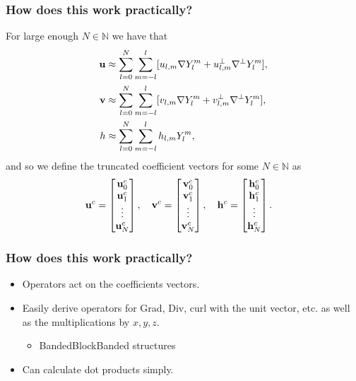 \documentclass[10pt]{beamer}
\newcommand{\N}{\mathbb{N}}
\newcommand{\Ylm}{Y^m_l}
\newcommand{\gradYlm}{\nabla Y^m_l}
\newcommand{\gradpYlm}{\nabla^\perp Y^m_l}
\begin{document}
\frame
{
    \frametitle{How does this work practically?}

For large enough \(N \in \N\) we have that
\begin{align}
\bold{u} &\approx \sum_{l=0}^{N} \sum_{m=-l}^{l} [ u_{l,m} \gradYlm + u^{\perp}_{l,m} \gradpYlm ], \\
\bold{v} &\approx \sum_{l=0}^{N} \sum_{m=-l}^{l} [ v_{l,m} \gradYlm + v^{\perp}_{l,m} \gradpYlm ], \\
h &\approx \sum_{l=0}^{N} \sum_{m=-l}^{l} h_{l,m} \Ylm,
\end{align}
and so we define the truncated coefficient vectors for some \(N \in \N\) as
\begin{align}
\bold{u}^c &= \begin{bmatrix}
			\bold{u}_0^c \\
			\bold{u}_1^c \\
			\vdots \\
			\bold{u}_N^c
		    \end{bmatrix},
\quad
\bold{v}^c = \begin{bmatrix}
			\bold{v}_0^c \\
			\bold{v}_1^c \\
			\vdots \\
			\bold{v}_N^c
		    \end{bmatrix},
\quad
\bold{h}^c = \begin{bmatrix}
			\bold{h}_0^c \\
			\bold{h}_1^c \\
			\vdots \\
			\bold{h}_N^c
		    \end{bmatrix}.		  
\end{align}

}

\frame
{
    \frametitle{How does this work practically?}
 
\begin{itemize}

\item Operators act on the coefficients vectors.

\item Easily derive operators for Grad, Div, curl with the unit vector, etc. as well as the multiplications by $x, y, z$.
\begin{itemize}
	\item BandedBlockBanded structures
\end{itemize}

\item Can calculate dot products simply.

\end{itemize}
    
}
\end{document}
